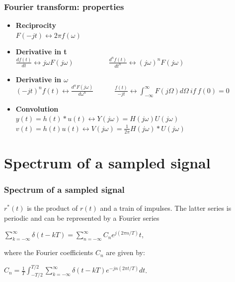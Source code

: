 \begin{frame}
	\frametitle{Fourier transform: properties}
	\begin{itemize}
		\item \textbf{Reciprocity} \\
		\medskip
		$F(-jt) \leftrightarrow  2 \pi f(\omega)$
		\medskip
		\item \textbf{Derivative in t} \\
		\medskip
		$\frac{df(t)}{dt} \leftrightarrow j\omega F(j\omega) \qquad \qquad \quad \frac{d^nf(t)}{dt^n} \leftrightarrow (j\omega)^n F(j\omega)$
		\medskip
		\item \textbf{Derivative in $\omega$} \\
		\medskip
		$(-jt)^n f(t) \leftrightarrow \frac{d^n F(j\omega)}{d\omega^n} \qquad \quad \frac{f(t)}{-jt} \leftrightarrow \int_{-\infty}^\infty F(j\Omega) d\Omega \> if \> f(0) = 0$
		\medskip
		\item \textbf{Convolution} \\
		\medskip
		$y(t) = h(t) * u(t) \leftrightarrow Y(j\omega) = H(j\omega) U(j\omega)$\\
		$v(t) = h(t)u(t) \leftrightarrow V(j\omega) = \frac{1}{2\pi} H(j\omega)*U(j\omega)$
	\end{itemize}
\end{frame}

\section{Spectrum of a sampled signal}

\begin{frame}
	\frametitle{Spectrum of a sampled signal}
	\vspace{-5ex}
	$r^*(t)$ is the product of $r(t)$ and a train of impulses. The latter series is periodic and can be represented by a Fourier series\\
	\begin{center}
		$\sum_{k=-\infty}^{\infty} \delta(t-kT) = \sum_{n=-\infty}^{\infty} C_ne^{j(2\pi n/T)}t$,
	\end{center}
	where the Fourier coefficients $C_n$ are given by:\\
	\begin{center}
		$C_n=\frac{1}{T}\int_{-T/2}^{T/2} \sum_{k=-\infty}^{\infty} \delta(t-kT)e^{-jn(2\pi t/T)}dt$.
	\end{center}
	
\end{frame}

